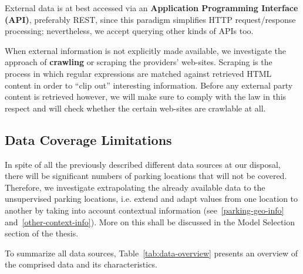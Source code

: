 \documentclass{article}
\begin{document}
External data is at best accessed via an \textbf{Application Programming Interface (API)}, preferably REST, since this paradigm simplifies HTTP request/response processing; nevertheless, we accept querying other kinds of APIs too.

When external information is not explicitly made available, we investigate the approach of \textbf{crawling} or scraping the providers' web-sites. Scraping is the process in which regular expressions are matched against retrieved HTML content in order to ``clip out'' interesting information. Before any external party content is retrieved however, we will make sure to comply with the law in this respect and will check whether the certain web-sites are crawlable at all.

\subsection{Data Coverage Limitations}
In spite of all the previously described different data sources at our disposal, there will be significant numbers of parking locations that will not be covered. Therefore, we investigate extrapolating the already available data to the unsupervised parking locations, i.e. extend and adapt values from one location to another by taking into account contextual information (see~\ref{parking-geo-info} and~\ref{other-context-info}). More on this shall be discussed in the Model Selection section of the thesis.

\vspace{2mm}
To summarize all data sources, Table~\ref{tab:data-overview} presents an overview of the comprised data and its characteristics.

\begin{table}
	\caption{Data overview and its features}
    \label{tab:data-overview}
\end{table}
\end{document}
